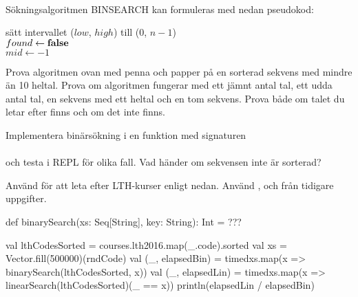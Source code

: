 \QUESTEND







\QUESTBEGIN

\Task  \what~  \\Sökningsalgoritmen BINSEARCH kan formuleras med nedan pseudokod:

\begin{algorithm}[H]

 sätt intervallet ($low$, $high$) till ($0$, $n - 1$) \\
 $found \leftarrow \bf{false}$ \\
 $mid \leftarrow -1$\\
\end{algorithm}

\Subtask Prova algoritmen ovan med penna och papper på en sorterad sekvens med mindre än 10 heltal. Prova om algoritmen fungerar med ett jämnt antal tal, ett udda antal tal, en sekvens med ett heltal och en tom sekvens. Prova både om talet du letar efter finns och om det inte finns.

\Subtask Implementera binärsökning i en funktion med signaturen\\
\\
och testa i REPL för olika fall. Vad händer om sekvensen inte är sorterad?

\Subtask Använd  för att leta efter LTH-kurser enligt nedan. Använd ,  och  från tidigare uppgifter.
\begin{Code}
def binarySearch(xs: Seq[String], key: String): Int = ???

val lthCodesSorted = courses.lth2016.map(_.code).sorted
val xs = Vector.fill(500000)(rndCode)
val (_, elapsedBin) =
  timed{xs.map(x => binarySearch(lthCodesSorted, x))}
val (_, elapsedLin) =
  timed{xs.map(x => linearSearch(lthCodesSorted)(_ == x))}
println(elapsedLin / elapsedBin)
\end{Code}


